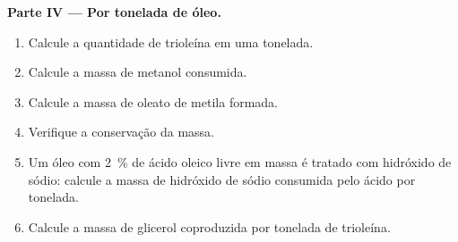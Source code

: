 \begin{problem}
\medskip
\noindent\textbf{Parte IV --- Por tonelada de óleo.}
\begin{enumerate}[resume]
  \item Calcule a quantidade de trioleína em uma tonelada.
  \item Calcule a massa de metanol consumida.
  \item Calcule a massa de oleato de metila formada.
  \item Verifique a conservação da massa.
  \item Um óleo com 2~\% de ácido oleico livre em massa é tratado com hidróxido de sódio: calcule a
        massa de hidróxido de sódio consumida pelo ácido por tonelada.
  \item Calcule a massa de glicerol coproduzida por tonelada de trioleína.
\end{enumerate}
\end{problem}
